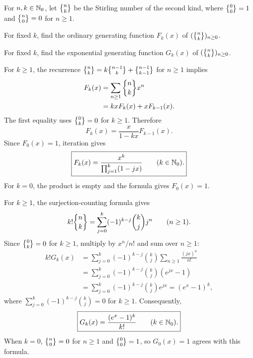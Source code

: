 \documentclass[11pt, oneside]{article}
\begin{document}
\begin{problem}
For $n, k\in\mathbb{N}_0$, let $\stirtwo{n}{k}$ be the Stirling number of
the second kind, where $\stirtwo{0}{0}=1$ and
$\stirtwo{n}{0}=0$ for $n\ge1$.
\begin{problemsubparts}
\item For fixed $k$, find the ordinary generating function $F_k(x)$
of $(\stirtwo{n}{k})_{n\ge0}$.
\item For fixed $k$, find the exponential generating function $G_k(x)$
of $(\stirtwo{n}{k})_{n\ge0}$.
\end{problemsubparts}
\end{problem}
\begin{solution}
\begin{problemsubparts}
\item For $k\ge1$, the recurrence
$\stirtwo{n}{k}=k\stirtwo{n-1}{k}+\stirtwo{n-1}{k-1}$ for $n\ge1$ implies
\[
\begin{aligned}
F_k(x)
&=\sum_{n\ge1}\stirtwo{n}{k}x^n\\
&=kxF_k(x)+xF_{k-1}(x).
\end{aligned}
\]
The first equality uses $\stirtwo{0}{k}=0$ for $k\ge1$. Therefore
\[
F_k(x)=\frac{x}{1-kx}F_{k-1}(x).
\]
Since $F_0(x)=1$, iteration gives
\[
\boxed{F_k(x)=\frac{x^k}{\prod_{j=1}^{k}(1-jx)}\qquad(k\in\mathbb{N}_0).}
\]
For $k=0$, the product is empty and the formula gives $F_0(x)=1$.
\item For $k\ge1$, the surjection-counting formula gives
\[
k!\stirtwo{n}{k}=\sum_{j=0}^{k}(-1)^{k-j}\binom kj j^n
\qquad(n\ge1).
\]
Since $\stirtwo{0}{k}=0$ for $k\ge1$, multiply by $x^n/n!$
and sum over $n\ge1$:
\[
\begin{aligned}
k!G_k(x)
&=\sum_{j=0}^{k}(-1)^{k-j}\binom kj
  \sum_{n\ge1}\frac{(jx)^n}{n!}\\
&=\sum_{j=0}^{k}(-1)^{k-j}\binom kj(e^{jx}-1)\\
&=\sum_{j=0}^{k}(-1)^{k-j}\binom kj e^{jx}
=(e^x-1)^k,
\end{aligned}
\]
where $\sum_{j=0}^{k}(-1)^{k-j}\binom kj=0$ for $k\ge1$.
Consequently,
\[
\boxed{G_k(x)=\frac{(e^x-1)^k}{k!}\qquad(k\in\mathbb{N}_0).}
\]
When $k=0$, $\stirtwo{n}{0}=0$ for $n\ge1$ and $\stirtwo{0}{0}=1$,
so $G_0(x)=1$ agrees with this formula.
\end{problemsubparts}
\end{solution}
\end{document}
